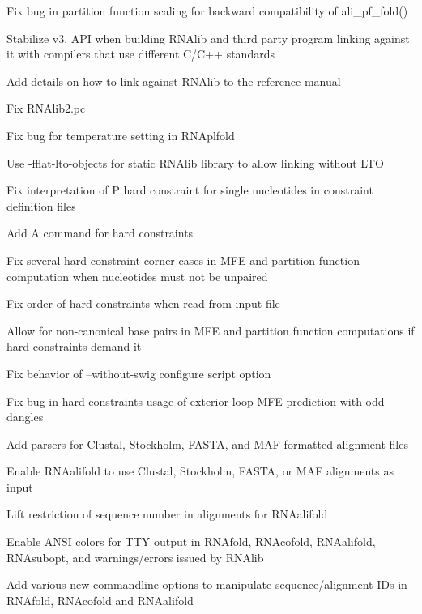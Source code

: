 \begin{DoxyItemize}
\item Fix bug in partition function scaling for backward compatibility of ali\+\_\+pf\+\_\+fold()
\item Stabilize v3. A\+PI when building R\+N\+Alib and third party program linking against it with compilers that use different C/\+C++ standards
\item Add details on how to link against R\+N\+Alib to the reference manual
\item Fix R\+N\+Alib2.\+pc
\item Fix bug for temperature setting in R\+N\+Aplfold
\item Use -\/fflat-\/lto-\/objects for static R\+N\+Alib library to allow linking without L\+TO
\item Fix interpretation of \textquotesingle{}P\textquotesingle{} hard constraint for single nucleotides in constraint definition files
\item Add \textquotesingle{}A\textquotesingle{} command for hard constraints
\item Fix several hard constraint corner-\/cases in M\+FE and partition function computation when nucleotides must not be unpaired
\item Fix order of hard constraints when read from input file
\item Allow for non-\/canonical base pairs in M\+FE and partition function computations if hard constraints demand it
\item Fix behavior of --without-\/swig configure script option
\item Fix bug in hard constraints usage of exterior loop M\+FE prediction with odd dangles
\item Add parsers for Clustal, Stockholm, F\+A\+S\+TA, and M\+AF formatted alignment files
\item Enable R\+N\+Aalifold to use Clustal, Stockholm, F\+A\+S\+TA, or M\+AF alignments as input
\item Lift restriction of sequence number in alignments for R\+N\+Aalifold
\item Enable A\+N\+SI colors for T\+TY output in R\+N\+Afold, R\+N\+Acofold, R\+N\+Aalifold, R\+N\+Asubopt, and warnings/errors issued by R\+N\+Alib
\item Add various new commandline options to manipulate sequence/alignment I\+Ds in R\+N\+Afold, R\+N\+Acofold and R\+N\+Aalifold
\end{DoxyItemize}

